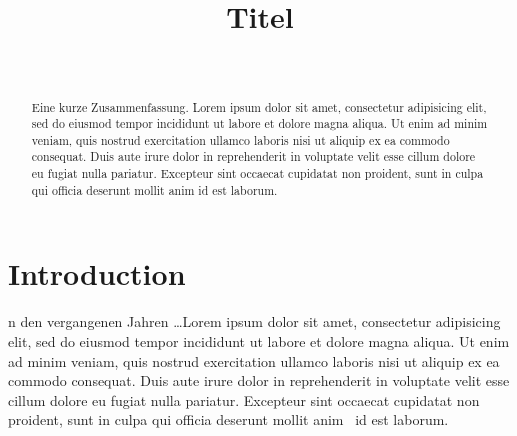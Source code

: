 \documentclass[10pt,a4paper,compsoc]{IEEEtran}
\begin{document}
\title{Titel}
\author{%
\\
%
}



\maketitle

\begin{abstract}
Eine kurze Zusammenfassung. Lorem ipsum dolor sit amet, consectetur adipisicing elit, sed do eiusmod tempor incididunt ut labore et dolore magna aliqua. Ut enim ad minim veniam, quis nostrud exercitation ullamco laboris nisi ut aliquip ex ea commodo consequat. Duis aute irure dolor in reprehenderit in voluptate velit esse cillum dolore eu fugiat nulla pariatur. Excepteur sint occaecat cupidatat non proident, sunt in culpa qui officia deserunt mollit anim id est laborum.
\end{abstract}

\section{Introduction}

n den vergangenen Jahren \dots Lorem ipsum dolor sit amet, consectetur adipisicing elit, sed do eiusmod tempor incididunt ut labore et dolore magna aliqua. Ut enim ad minim veniam, quis nostrud exercitation ullamco laboris nisi ut aliquip ex ea commodo consequat. Duis aute irure dolor in reprehenderit in voluptate velit esse cillum dolore eu fugiat nulla pariatur. Excepteur sint occaecat cupidatat non proident, sunt in culpa qui officia deserunt mollit anim~\cite{test} id est laborum.
\end{document}
